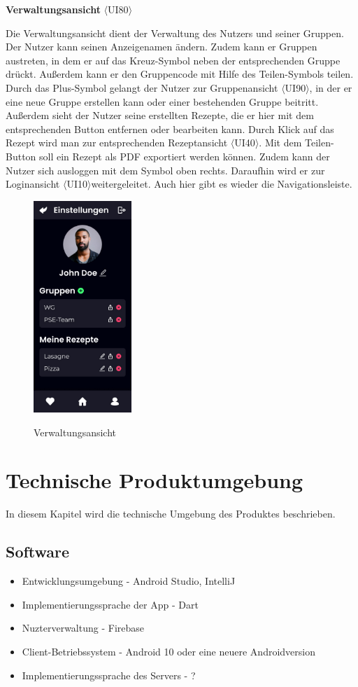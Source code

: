 \documentclass[parskip=full]{scrartcl}
\begin{document}
\textbf{Verwaltungsansicht} $\langle$UI80$\rangle$

Die Verwaltungsansicht dient der Verwaltung des Nutzers und seiner Gruppen. Der Nutzer kann seinen Anzeigenamen ändern. Zudem kann er Gruppen austreten, in dem er auf das Kreuz-Symbol neben der entsprechenden Gruppe drückt. Außerdem kann er den Gruppencode mit Hilfe des Teilen-Symbols teilen. Durch das Plus-Symbol gelangt der Nutzer zur Gruppenansicht $\langle$UI90$\rangle$, in der er eine neue Gruppe erstellen kann oder einer bestehenden Gruppe beitritt. Außerdem sieht der Nutzer seine erstellten Rezepte, die er hier mit dem entsprechenden Button entfernen oder bearbeiten kann. Durch Klick auf das Rezept wird man zur entsprechenden Rezeptansicht $\langle$UI40$\rangle$. Mit dem Teilen-Button soll ein Rezept als PDF exportiert werden können.
Zudem kann der Nutzer sich ausloggen mit dem Symbol oben rechts. Daraufhin wird er zur Loginansicht $\langle$UI10$\rangle$weitergeleitet. Auch hier gibt es wieder die Navigationsleiste.

\begin{figure}[!htp]
    \centering
    \includegraphics[height=80mm]{images/section7/SettingsView.jpg}
    \label{fig:A79}
    \caption{Verwaltungsansicht}
\end{figure}
\newpage
\section{Technische Produktumgebung}
In diesem Kapitel wird die technische Umgebung des Produktes beschrieben.

\subsection{Software}
\begin{itemize}
    \item Entwicklungsumgebung - Android Studio, IntelliJ
    \item Implementierungssprache der App - Dart
    \item Nuzterverwaltung - Firebase
    \item Client-Betriebssystem - Android 10 oder eine neuere Androidversion
    \item Implementierungssprache des Servers - ?
\end{itemize}
\end{document}

